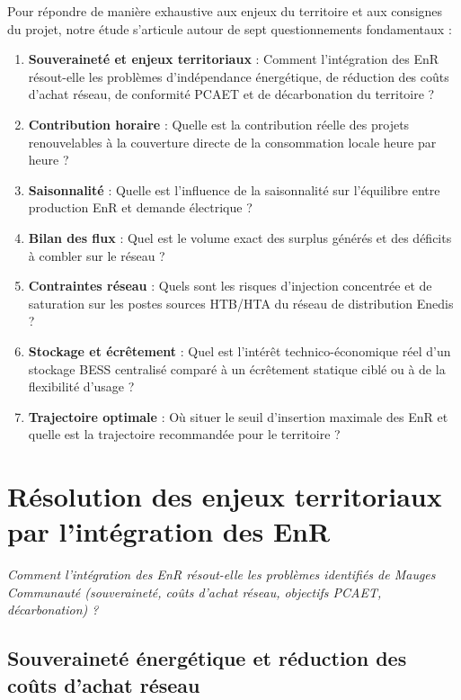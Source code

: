 \documentclass[12pt, a4paper]{report}
\begin{document}
Pour répondre de manière exhaustive aux enjeux du territoire et aux consignes du projet, notre étude s'articule autour de sept questionnements fondamentaux :
\begin{enumerate}
  \item \textbf{Souveraineté et enjeux territoriaux} : Comment l'intégration des EnR résout-elle les problèmes d'indépendance énergétique, de réduction des coûts d'achat réseau, de conformité PCAET et de décarbonation du territoire ?
  \item \textbf{Contribution horaire} : Quelle est la contribution réelle des projets renouvelables à la couverture directe de la consommation locale heure par heure ?
  \item \textbf{Saisonnalité} : Quelle est l'influence de la saisonnalité sur l'équilibre entre production EnR et demande électrique ?
  \item \textbf{Bilan des flux} : Quel est le volume exact des surplus générés et des déficits à combler sur le réseau ?
  \item \textbf{Contraintes réseau} : Quels sont les risques d'injection concentrée et de saturation sur les postes sources HTB/HTA du réseau de distribution Enedis ?
  \item \textbf{Stockage et écrêtement} : Quel est l'intérêt technico-économique réel d'un stockage BESS centralisé comparé à un écrêtement statique ciblé ou à de la flexibilité d'usage ?
  \item \textbf{Trajectoire optimale} : Où situer le seuil d'insertion maximale des EnR et quelle est la trajectoire recommandée pour le territoire ?
\end{enumerate}


\chapter{Résolution des enjeux territoriaux par l'intégration des EnR}

\emph{Comment l'intégration des EnR résout-elle les problèmes identifiés de Mauges Communauté (souveraineté, coûts d'achat réseau, objectifs PCAET, décarbonation) ?}

\section{Souveraineté énergétique et réduction des coûts d'achat réseau}
\end{document}
